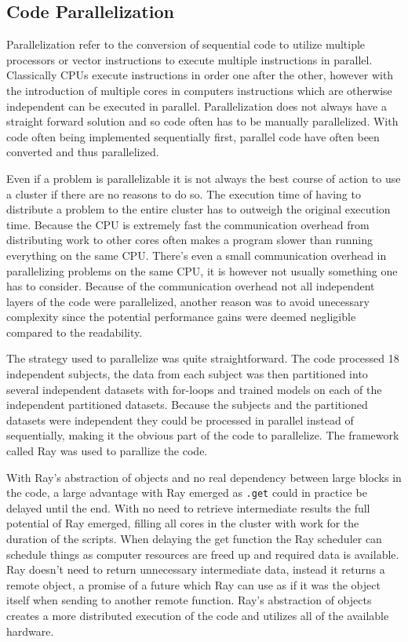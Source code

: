 \documentclass[12pt, a4paper]{article}
\begin{document}
\subsection{Code Parallelization}

Parallelization refer to the conversion of sequential code to utilize multiple processors or vector instructions to execute multiple instructions in parallel.
Classically CPUs execute instructions in order one after the other, however with the introduction of multiple cores in computers instructions which are otherwise independent can be executed in parallel.
Parallelization does not always have a straight forward solution and so code often has to be manually parallelized.
With code often being implemented sequentially first, parallel code have often been converted and thus parallelized.

Even if a problem is parallelizable it is not always the best course of action to use a cluster if there are no reasons to do so.
The execution time of having to distribute a problem to the entire cluster has to outweigh the original execution time.
Because the CPU is extremely fast the communication overhead from distributing work to other cores often makes a program slower than running everything on the same CPU.
There's even a small communication overhead in parallelizing problems on the same CPU, it is however not usually something one has to consider.
Because of the communication overhead not all independent layers of the code were parallelized, another reason was to avoid unecessary complexity since the potential performance gains were deemed negligible compared to the readability.

The strategy used to parallelize was quite straightforward. 
The code processed 18 independent subjects, the data from each subject was then partitioned into several independent datasets with for-loops and trained models on each of the independent partitioned datasets. 
Because the subjects and the partitioned datasets were independent they could be processed in parallel instead of sequentially, making it the obvious part of the code to parallelize.
The framework called Ray was used to parallize the code. 

With Ray's abstraction of objects and no real dependency between large blocks in the code, a large advantage with Ray emerged as \texttt{.get} could in practice be delayed until the end.
With no need to retrieve intermediate results the full potential of Ray emerged, filling all cores in the cluster with work for the duration of the scripts.
When delaying the get function the Ray scheduler can schedule things as computer resources are freed up and required data is available.
Ray doesn't need to return unnecessary intermediate data, instead it returns a remote object, a promise of a future which Ray can use as if it was the object itself when sending to another remote function.
Ray's abstraction of objects creates a more distributed execution of the code and utilizes all of the available hardware.
\end{document}
